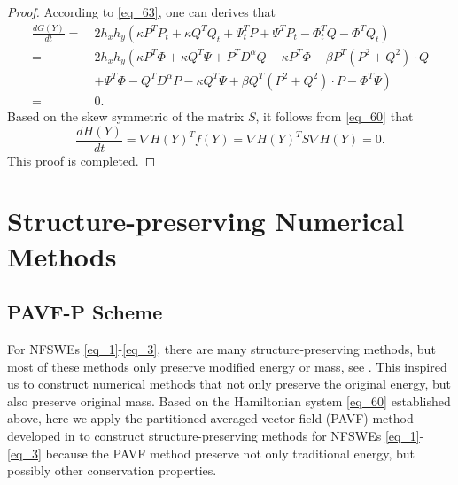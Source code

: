 \documentclass[preprint,compress,3p,10pt,fleqn]{elsarticle}
\numberwithin{equation}{section}
\begin{document}
\begin{proof}
According to \eqref{eq_63}, one can derives that
\begin{align}\label{eq_64}
\frac{d G(Y)}{d t}=&~2 h_{x} h_{y}\left(\kappa P^{T}P_t+\kappa Q^{T}Q_t+\Psi^{T}_t P+\Psi^{T}P_{t}-\varPhi^{T}_t Q-\varPhi^{T}Q_{t}\right)\nonumber\\
=&~2 h_{x} h_{y}\left(\kappa P^{T}\varPhi+\kappa Q^{T}\Psi + P^{T}D^{\alpha}Q-\kappa P^{T}\varPhi-\beta P^{T}\left( P^{2}+Q^{2}\right)\cdot Q\right.\nonumber\\
&~\left.+\Psi^{T}\varPhi-Q^{T}D^{\alpha}P-\kappa Q^{T}\Psi+\beta Q^{T}\left( P^{2}+Q^{2}\right)\cdot P-\varPhi^{T}\Psi\right)\nonumber\\
=&~0.
\end{align}
Based on the skew symmetric of the matrix $S$, it follows from \eqref{eq_60} that
\begin{equation}\label{eq_65}
\frac{d H(Y)}{d t}=\nabla H(Y)^{T} f(Y)=\nabla H(Y)^{T} S \nabla H(Y)=0 .
\end{equation}
This proof is completed.
\end{proof}


\section{Structure-preserving Numerical Methods}\label{Section 3}
\subsection{PAVF-P Scheme}

For NFSWEs \eqref{eq_1}-\eqref{eq_3}, there are many structure-preserving methods, but most of these methods only preserve modified energy or mass, see \cite{liFastEnergyConserving2018,huEfficientEnergyPreserving2022}. This inspired us to construct numerical methods that not only preserve the original energy, but also preserve original mass. Based on the Hamiltonian system \eqref{eq_60} established above, here we apply the partitioned averaged vector field (PAVF) method developed in  \cite{caiPartitionedAveragedVector2018} to construct structure-preserving methods for NFSWEs \eqref{eq_1}-\eqref{eq_3} because the PAVF method preserve not only traditional energy, but possibly other conservation properties.
\end{document}
